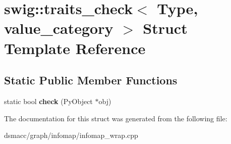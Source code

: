 \hypertarget{structswig_1_1traits__check_3_01Type_00_01value__category_01_4}{}\section{swig\+:\+:traits\+\_\+check$<$ Type, value\+\_\+category $>$ Struct Template Reference}
\label{structswig_1_1traits__check_3_01Type_00_01value__category_01_4}
\subsection*{Static Public Member Functions}
\begin{DoxyCompactItemize}
\item 
\mbox{\label{structswig_1_1traits__check_3_01Type_00_01value__category_01_4_a7b6a0811d1ac4cb4038c2eb8305411d0}} 
static bool {\bfseries check} (Py\+Object $\ast$obj)
\end{DoxyCompactItemize}


The documentation for this struct was generated from the following file\+:\begin{DoxyCompactItemize}
\item 
dsmacc/graph/infomap/infomap\+\_\+wrap.\+cpp\end{DoxyCompactItemize}
